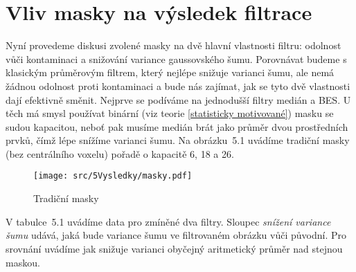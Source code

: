 
\section{Vliv masky na výsledek filtrace}\label{diskuse masky}

    Nyní provedeme diskusi zvolené masky na dvě hlavní vlastnosti filtru: odolnost vůči kontaminaci a snižování variance gaussovského šumu. Porovnávat budeme s klasickým průměrovým filtrem, který nejlépe snižuje varianci šumu, ale nemá žádnou odolnost proti kontaminaci a bude nás zajímat, jak se tyto dvě vlastnosti dají efektivně směnit. Nejprve se podíváme na jednodušší filtry medián a BES. U těch má smysl používat binární (viz teorie \ref{statisticky motivované}) masku se sudou kapacitou, neboť pak musíme medián brát jako průměr dvou prostředních prvků, čímž lépe snížíme varianci šumu. Na obrázku~5.1 uvádíme tradiční masky (bez centrálního voxelu) pořadě o kapacitě 6, 18 a 26.

\begin{figure}[h]\label{obr masky}
  \texttt{[image: src/5Vysledky/masky.pdf]}
  \caption{Tradiční masky}
\end{figure}

    V tabulce~5.1 uvádíme data pro zmíněné dva filtry. Sloupec \emph{snížení variance šumu} udává, jaká bude variance šumu ve filtrovaném obrázku vůči původní. Pro srovnání uvádíme jak snižuje varianci obyčejný aritmetický průměr nad stejnou maskou.

